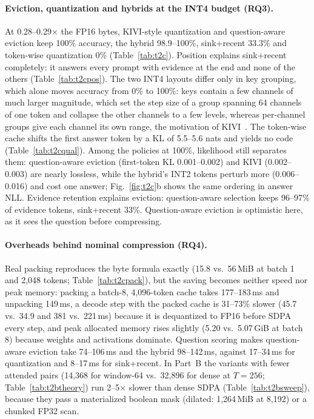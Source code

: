 \documentclass{article}
\begin{document}
\paragraph{Eviction, quantization and hybrids at the INT4 budget (RQ3).}
At 0.28--0.29$\times$ the FP16 bytes, KIVI-style quantization and question-aware eviction keep 100\% accuracy, the hybrid
98.9--100\%, sink+recent 33.3\% and token-wise quantization 0\% (Table~\ref{tab:t2c}). Position explains sink+recent
completely: it answers every prompt with evidence at the end and none of the others (Table~\ref{tab:t2cpos}). The two INT4
layouts differ only in key grouping, which alone moves accuracy from 0\% to 100\%: keys contain a few channels of much
larger magnitude, which set the step size of a group spanning 64 channels of one token and collapse the other channels
to a few levels, whereas per-channel groups give each channel its own range, the motivation of KIVI~\citep{liu2024kivi}.
The token-wise cache shifts the first answer token by a KL of 5.5--5.6 nats and yields no code (Table~\ref{tab:t2cqual}).
Among the policies at 100\%, likelihood still separates them: question-aware eviction (first-token KL 0.001--0.002) and
KIVI (0.002--0.003) are nearly lossless, while the hybrid's INT2 tokens perturb more (0.006--0.016) and cost one answer;
Fig.~\ref{fig:t2c}b shows the same ordering in answer NLL. Evidence retention explains eviction: question-aware selection
keeps 96--97\% of evidence tokens, sink+recent 33\%. Question-aware eviction is optimistic here, as it sees the question
before compressing.

\paragraph{Overheads behind nominal compression (RQ4).}
Real packing reproduces the byte formula exactly (15.8 vs.\ 56\,MiB at batch 1 and 2,048 tokens; Table~\ref{tab:t2cpack}),
but the saving becomes neither speed nor peak memory: packing a batch-8, 4,096-token cache takes 177--183\,ms and unpacking
149\,ms, a decode step with the packed cache is 31--73\% slower (45.7 vs.\ 34.9 and 381 vs.\ 221\,ms) because it is
dequantized to FP16 before SDPA every step, and peak allocated memory rises slightly (5.20 vs.\ 5.07\,GiB at batch 8)
because weights and activations dominate. Question scoring makes question-aware eviction take 74--106\,ms and the hybrid
98--142\,ms, against 17--34\,ms for quantization and 8--17\,ms for sink+recent. In Part~B the variants with fewer attended
pairs (14,368 for window-64 vs.\ 32,896 for dense at $T=256$; Table~\ref{tab:t2btheory}) run 2--5$\times$ slower than dense
SDPA (Table~\ref{tab:t2bsweep}), because they pass a materialized boolean mask (dilated: 1,264\,MiB at 8,192) or a chunked
FP32 scan.
\end{document}
